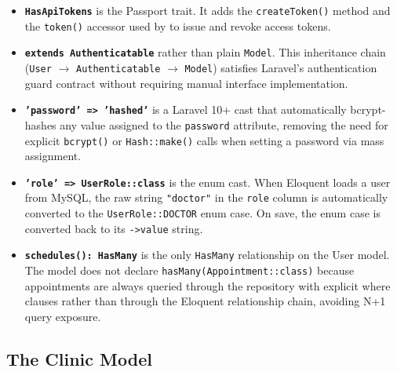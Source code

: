 \begin{itemize}
  \item \textbf{\texttt{HasApiTokens}} is the Passport trait. It adds the
    \texttt{createToken()} method and the \texttt{token()} accessor used
    by  to issue and revoke access tokens.

  \item \textbf{\texttt{extends Authenticatable}} rather than plain
    \texttt{Model}. This inheritance chain (\texttt{User} $\to$
    \texttt{Authenticatable} $\to$ \texttt{Model}) satisfies Laravel's
    authentication guard contract without requiring manual interface
    implementation.

  \item \textbf{\texttt{'password' => 'hashed'}} is a Laravel 10+
    cast that automatically bcrypt-hashes any value assigned to the
    \texttt{password} attribute, removing the need for explicit
    \texttt{bcrypt()} or \texttt{Hash::make()} calls when setting a
    password via mass assignment.

  \item \textbf{\texttt{'role' => UserRole::class}} is the enum cast.
    When Eloquent loads a user from MySQL, the raw string
    \texttt{"doctor"} in the \texttt{role} column is automatically
    converted to the \texttt{UserRole::DOCTOR} enum case. On save, the
    enum case is converted back to its \texttt{->value} string.

  \item \textbf{\texttt{schedules(): HasMany}} is the only
    \texttt{HasMany} relationship on the User model. The model does not
    declare \texttt{hasMany(Appointment::class)} because appointments
    are always queried through the repository with explicit where clauses
    rather than through the Eloquent relationship chain, avoiding N+1
    query exposure.
\end{itemize}

\subsection{The Clinic Model}

